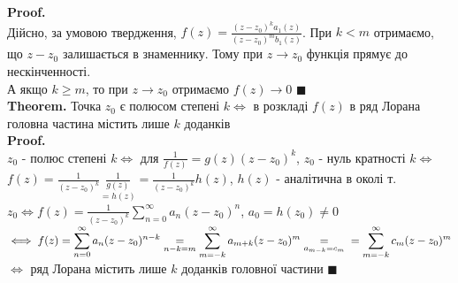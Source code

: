 \documentclass[a4paper, 14pt]{extarticle}
\def\hugespace{\vspace{5mm} \\}
\begin{document}
\textbf{Proof.}\\
Дійсно, за умовою твердження, $\displaystyle f(z)=\frac{(z-z_0)^k a_1(z)}{(z-z_0)^m b_1(z)}$. При $k<m$ отримаємо, що $z-z_0$ залишається в знаменнику. Тому при $z\to z_0$ функція прямує до нескінченності.\\
А якщо $k \geq m$, то при $z \to z_0$ отримаємо $f(z) \to 0$ $\blacksquare$
\hugespace
\textbf{Theorem.} Точка $z_0$ є полюсом степені $k \iff$ в розкладі $f(z)$ в ряд Лорана головна частина містить лише $k$ доданків\\
\textbf{Proof.}\\
$z_0$ - полюс степені $k \iff$ для $\displaystyle \frac{1}{f(z)} = g(z)(z-z_0)^k$, $z_0$ - нуль кратності $k \iff$ $\displaystyle f(z)=\frac{1}{(z-z_0)^k} \underset{=h(z)}{\frac{1}{g(z)}} = \frac{1}{(z-z_0)^k} h(z)$, $h(z)$ - аналітична в околі т. $z_0 \iff \displaystyle f(z)=\frac{1}{(z-z_0)^k} \sum_{n=0}^{\infty}a_n(z-z_0)^n$, $a_0 = h(z_0) \neq 0$\\
$\iff \displaystyle f(z)=\sum_{n=0}^{\infty} a_n(z-z_0)^{n-k} \underset{n-k=m}{=} \sum_{m=-k}^{\infty} a_{m+k}(z-z_0)^{m} \underset{a_{m-k}=c_m}{=} \\ = \sum_{m=-k}^{\infty} c_m (z-z_0)^{m}$ $\iff$ ряд Лорана містить лише $k$ доданків головної частини $\blacksquare$
\hugespace
\end{document}

